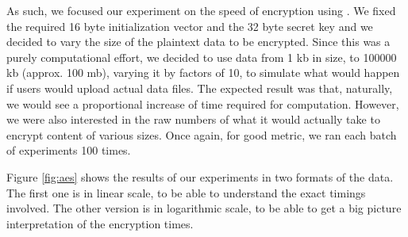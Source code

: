 As such, we focused our experiment on the speed of encryption using .
We fixed the required 16 byte initialization vector and the 32 byte secret key and we decided to vary the size of the plaintext data to be encrypted.
Since this was a purely computational effort, we decided to use data from 1 kb in size, to 100000 kb (approx. 100 mb), varying it by factors of 10, to simulate what would happen if users would upload actual data files.
The expected result was that, naturally, we would see a proportional increase of time required for computation.
However, we were also interested in the raw numbers of what it would actually take to encrypt content of various sizes.
Once again, for good metric, we ran each batch of experiments 100 times.

Figure \ref{fig:aes} shows the results of our experiments in two formats of the data.
The first one is in linear scale, to be able to understand the exact timings involved.
The other version is in logarithmic scale, to be able to get a big picture interpretation of the encryption times.

